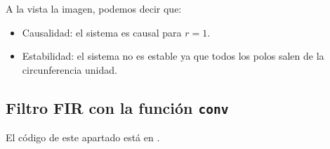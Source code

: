 \documentclass[11pt,a4paper]{article}
\begin{document}
A la vista la imagen, podemos decir que:

\begin{itemize}
	\item Causalidad: el sistema es causal para $r=1$.
	\item Estabilidad: el sistema no es estable ya que todos los polos salen de la circunferencia unidad.
\end{itemize}

\subsection{Filtro FIR con la función \texttt{conv}}

El código de este apartado está en \color{deepred}\color{black}.\\
\end{document}
